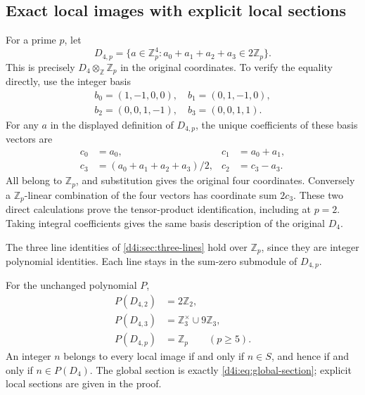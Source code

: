 \subsection{Exact local images with explicit local sections}
\label{d4i:sec:local-images}

For a prime $p$, let
\[
 D_{4,p}=\{a\in\mathbb Z_p^4:
                            a_0+a_1+a_2+a_3\in2\mathbb Z_p\}.
 \label{d4i:eq:local-domain}\tag{D4I18}
\]
This is precisely $D_4\otimes_{\mathbb Z}\mathbb Z_p$ in the original
coordinates. To verify the equality directly, use the integer basis
\[
\begin{gathered}
 b_0=(1,-1,0,0),\quad b_1=(0,1,-1,0),\\
 b_2=(0,0,1,-1),\quad b_3=(0,0,1,1).
\end{gathered}
 \label{d4i:eq:integral-basis}\tag{D4I19}
\]
For any $a$ in the displayed definition of $D_{4,p}$, the unique
coefficients of these basis vectors are
\[
\begin{aligned}
 c_0&=a_0,&c_1&=a_0+a_1,\\
 c_3&=(a_0+a_1+a_2+a_3)/2,&c_2&=c_3-a_3.
\end{aligned}
 \label{d4i:eq:local-basis-inverse}\tag{D4I20}
\]
All belong to $\mathbb Z_p$, and substitution gives the original
four coordinates. Conversely a $\mathbb Z_p$-linear combination
of the four vectors has coordinate sum $2c_3$. These two direct
calculations prove the tensor-product identification, including
at $p=2$. Taking integral coefficients gives the same basis
description of the original $D_4$.

The three line identities of \cref{d4i:sec:three-lines} hold over
$\mathbb Z_p$, since they are integer polynomial identities. Each
line stays in the sum-zero submodule of $D_{4,p}$.

\begin{theorem}
\label{d4i:thm:local-images}
For the unchanged polynomial $P$,
\[
\begin{aligned}
 P(D_{4,2})&=2\mathbb Z_2,\\
 P(D_{4,3})&=\mathbb Z_3^{\times}\cup9\mathbb Z_3,\\
 P(D_{4,p})&=\mathbb Z_p\qquad(p\ge5).
\end{aligned}
 \label{d4i:eq:local-images}\tag{D4I21}
\]
An integer $n$ belongs to every local image if and only if
$n\in S$, and hence if and only if $n\in P(D_4)$. The global
section is exactly \eqref{d4i:eq:global-section}; explicit local
sections are given in the proof.
\end{theorem}

